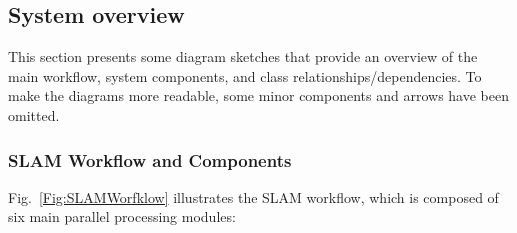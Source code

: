 \documentclass{article}
\begin{document}
\subsection{System overview}\label{system_overview}

This section presents some diagram sketches that provide an overview of the main workflow, system components, and class relationships/dependencies. To make the diagrams more readable, some minor components and arrows have been omitted.


\subsubsection{SLAM Workflow and Components} 

Fig.~\ref{Fig:SLAMWorfklow} illustrates the SLAM workflow, which is composed of six main parallel processing modules:
\end{document}
